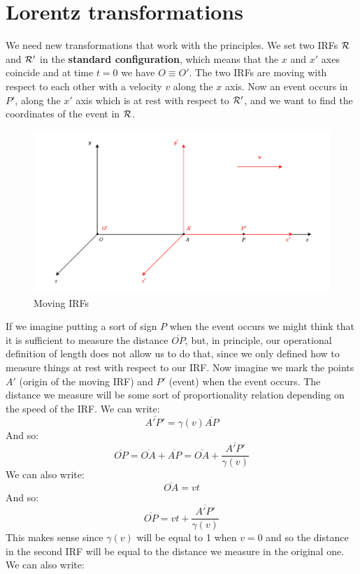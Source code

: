 \section{Lorentz transformations}
We need new transformations that work with the principles. We set two IRFs $\mathcal{R}$ and $\mathcal{R'}$ in the \textbf{standard configuration}, which means that the $x$ and $x'$ axes coincide and at time $t=0$ we have $O \equiv O'$. The two IRFs are moving with respect to each other with a velocity $v$ along the $x$ axis. Now an event occurs in $P'$, along the $x'$ axis which is at rest with respect to $\mathcal{R'}$, and we want to find the coordinates of the event in $\mathcal{R}$.
\begin{figure}[H]
  \centering
  \includegraphics[width=0.6\linewidth]{res/svg/3d_IRF_lorentz.drawio}
  \caption{Moving IRFs}
\end{figure}
If we imagine putting a sort of sign $P$ when the event occurs we might think that it is sufficient to measure the distance $\overline{OP}$, but, in principle, our operational definition of length does not allow us to do that, since we only defined how to measure things at rest with respect to our IRF. Now imagine we mark the points $A'$ (origin of the moving IRF) and $P'$ (event) when the event occurs. The distance we measure will be some sort of proportionality relation depending on the speed of the IRF. We can write:
\begin{equation}
  \overline{A'P'} = \gamma (v)\overline{AP}
\end{equation}
And so:
\begin{equation}
  \overline{OP} = \overline{OA} + \overline{AP} = \overline{OA} + \dfrac{\overline{A'P'}}{\gamma (v)}
\end{equation}
We can also write:
\begin{equation}
  \overline{OA} = vt
\end{equation}
And so:
\begin{equation}
  \overline{OP} = vt + \dfrac{\overline{A'P'}}{\gamma (v)}
\end{equation}
This makes sense since $\gamma (v)$ will be equal to 1 when $v=0$ and so the distance in the second IRF will be equal to the distance we measure in the original one. We can also write:
